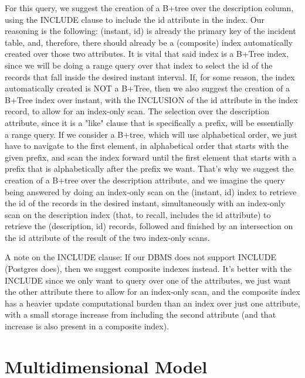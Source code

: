\documentclass[titlepage]{article}
\numberwithin{figure}{section}
\numberwithin{table}{section}
\begin{document}

    For this query, we suggest the creation of a B+tree over the description column, using the INCLUDE clause to include
    the id attribute in the index.
    Our reasoning is the following:
    (instant, id) is already the primary key of the incident table, and, therefore, there should already be a (composite)
    index automatically created over those two attributes.
    It is vital that said index is a B+Tree index, since we will
    be doing a range query over that index to select the id of the records that fall inside the desired instant interval.
    If, for some reason, the index automatically created is NOT a B+Tree, then we also suggest the creation of a B+Tree
    index over instant, with the INCLUSION of the id attribute in the index record, to allow for an index-only scan.
    The selection over the description attribute, since it is a "like" clause that is specifically a prefix, will be
    essentially a range query.
    If we consider a B+tree, which will use alphabetical order, we just have to navigate to the first element,
    in alphabetical order that starts with the given prefix, and scan the index forward until the first element that starts
    with a prefix that is alphabetically after the prefix we want.
    That's why we suggest the creation of a B+tree over the
    description attribute, and we imagine the query being answered by doing an index-only scan on the (instant, id) index
    to retrieve the id of the records in the desired instant, simultaneously with an index-only scan on the description index
    (that, to recall, includes the id attribute) to retrieve the (description, id) records, followed and finished by
    an intersection on the id attribute of the result of the two index-only scans.

    A note on the INCLUDE clause: If our DBMS does not support INCLUDE (Postgres does), then we suggest composite indexes
    instead.
    It's better with the INCLUDE since we only want to query over one of the attributes, we just want the other attribute
    there to allow for an index-only scan, and the composite index has a heavier update computational burden than an index
    over just one attribute, with a small storage increase from including the second attribute (and that increase is also
    present in a composite index).


    \section*{Multidimensional Model}
\end{document}
